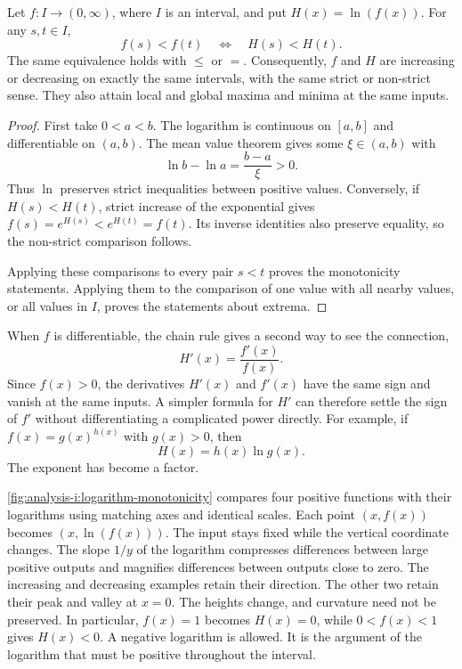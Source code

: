 \begin{proposition}
  \label{thm:analysis-i:logarithmic-monotonicity}
  Let $f:I\to(0,\infty)$, where $I$ is an interval, and put
  $H(x)=\ln(f(x))$. For any $s,t\in I$,
  \[
    f(s)<f(t)\quad\Longleftrightarrow\quad H(s)<H(t).
  \]
  The same equivalence holds with $\le$ or $=$. Consequently, $f$
  and $H$ are increasing or decreasing on exactly the same intervals,
  with the same strict or non-strict sense. They also attain local
  and global maxima and minima at the same inputs.
\end{proposition}
\begin{proof}
  First take $0<a<b$. The logarithm is continuous on $[a,b]$ and
  differentiable on $(a,b)$. The mean value theorem gives some
  $\xi\in(a,b)$ with
  \[
    \ln b-\ln a=\frac{b-a}{\xi}>0.
  \]
  Thus $\ln$ preserves strict inequalities between positive values.
  Conversely, if $H(s)<H(t)$, strict increase of the exponential gives
  $f(s)=e^{H(s)}<e^{H(t)}=f(t)$. Its inverse identities also preserve
  equality, so the non-strict comparison follows.

  Applying these comparisons to every pair $s<t$ proves the
  monotonicity statements. Applying them to the comparison of one
  value with all nearby values, or all values in $I$, proves the
  statements about extrema.
\end{proof}

When $f$ is differentiable, the chain rule gives a second way to see
the connection,
\[
  H'(x)=\frac{f'(x)}{f(x)}.
\]
Since $f(x)>0$, the derivatives $H'(x)$ and $f'(x)$ have the same sign
and vanish at the same inputs. A simpler formula for $H'$ can therefore
settle the sign of $f'$ without differentiating a complicated power
directly. For example, if $f(x)=g(x)^{h(x)}$ with $g(x)>0$, then
\[
  H(x)=h(x)\ln g(x).
\]
The exponent has become a factor.

\autoref{fig:analysis-i:logarithm-monotonicity} compares four positive
functions with their logarithms using matching axes and identical scales.
Each point $(x,f(x))$ becomes $(x,\ln(f(x)))$. The input stays fixed
while the vertical coordinate changes. The slope $1/y$ of the logarithm
compresses differences between large positive outputs and magnifies
differences between outputs close to zero.
The increasing and decreasing examples retain their direction.
The other two retain their peak and valley at $x=0$.
The heights change, and curvature need not be preserved.
In particular, $f(x)=1$ becomes $H(x)=0$, while $0<f(x)<1$ gives
$H(x)<0$. A negative logarithm is allowed. It is the argument of
the logarithm that must be positive throughout the interval.

